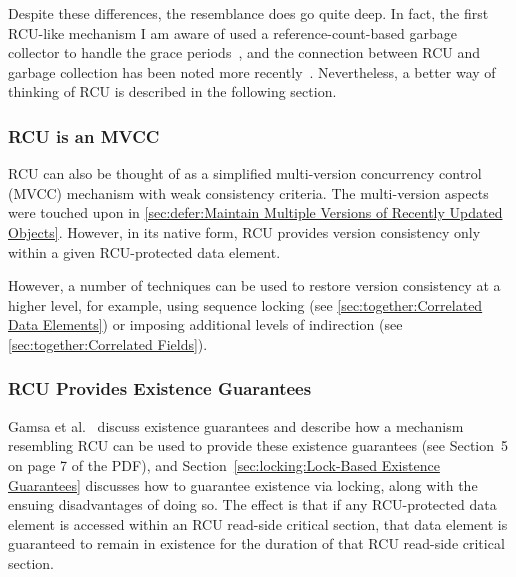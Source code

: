 Despite these differences, the resemblance does go quite deep.
In fact, the first RCU-like mechanism I am aware of used a
reference-count-based garbage collector to handle the grace
periods~\cite{Kung80}, and the connection between RCU and
garbage collection has been noted more
recently~\cite{HarshalSheth2016goRCU}.
Nevertheless, a better way of thinking of RCU is described in the
following section.

\subsubsection{RCU is an MVCC}
\label{sec:defer:RCU is an MVCC}

RCU can also be thought of as a simplified multi-version concurrency
control (MVCC) mechanism with weak consistency criteria.
The multi-version aspects were touched upon in
\cref{sec:defer:Maintain Multiple Versions of Recently Updated Objects}.
However, in its native form, RCU provides version consistency only
within a given RCU-protected data element.

However, a number of techniques can be used to restore version consistency
at a higher level, for example, using sequence locking
(see \cref{sec:together:Correlated Data Elements})
or imposing additional levels of indirection
(see \cref{sec:together:Correlated Fields}).

\subsubsection{RCU Provides Existence Guarantees}
\label{sec:defer:RCU Provides Existence Guarantees}

Gamsa et al.~\cite{Gamsa99}
discuss existence guarantees and describe how a mechanism
resembling RCU can be used to provide these existence guarantees
(see Section~5 on page 7 of the PDF), and
Section~\ref{sec:locking:Lock-Based Existence Guarantees}
discusses how to guarantee existence via locking, along with the
ensuing disadvantages of doing so.
The effect is that if any RCU-protected data element is accessed
within an RCU read-side critical section, that data element is
guaranteed to remain in existence for the duration of that RCU
read-side critical section.

